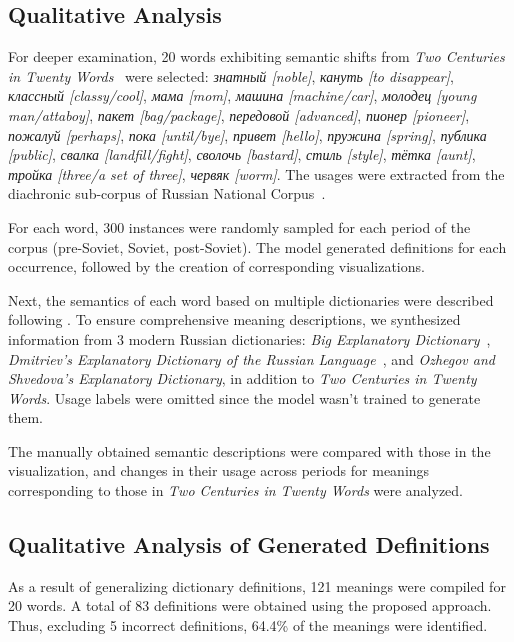 \documentclass[11pt]{article}
\begin{document}
\subsection{Qualitative Analysis}

For deeper examination, 20 words exhibiting semantic shifts from \textit{Two Centuries in Twenty Words}~\cite{TwoCenturies} were selected:
\textit{знатный [noble]}, \textit{кануть [to disappear]}, \textit{классный [classy/cool]}, \textit{мама [mom]}, \textit{машина [machine/car]},
\textit{молодец [young man/attaboy]}, \textit{пакет [bag/package]}, \textit{передовой [advanced]}, \textit{пионер [pioneer]},
\textit{пожалуй [perhaps]}, \textit{пока [until/bye]}, \textit{привет [hello]}, \textit{пружина [spring]}, \textit{публика [public]},
\textit{свалка [landfill/fight]}, \textit{сволочь [bastard]}, \textit{стиль [style]},
\textit{тётка [aunt]}, \textit{тройка [three/a set of three]}, \textit{червяк [worm]}.
The usages were extracted from the diachronic sub-corpus of Russian National Corpus~\cite{Ruscorpora}.

For each word, 300 instances were randomly sampled for each period of the corpus (pre-Soviet, Soviet, post-Soviet).
The model generated definitions for each occurrence, followed by the creation of corresponding visualizations.

Next, the semantics of each word based on multiple dictionaries were described following .
To ensure comprehensive meaning descriptions, we synthesized information from 3 modern Russian dictionaries:
\textit{Big Explanatory Dictionary}~\cite{TolkovyKuznetsov}, \textit{Dmitriev's Explanatory Dictionary of the Russian Language}~\cite{TolkovyDmitriev}, and \textit{Ozhegov and Shvedova's Explanatory Dictionary}, in addition to \textit{Two Centuries in Twenty Words}.
Usage labels were omitted since the model wasn't trained to generate them.

The manually obtained semantic descriptions were compared with those in the visualization,
and changes in their usage across periods for meanings corresponding to those in \textit{Two Centuries in Twenty Words} were analyzed.

\subsection{Qualitative Analysis of Generated Definitions}

As a result of generalizing dictionary definitions, 121 meanings were compiled for 20 words.
A total of 83 definitions were obtained using the proposed approach.
Thus, excluding 5 incorrect definitions, 64.4\% of the meanings were identified.
\end{document}
